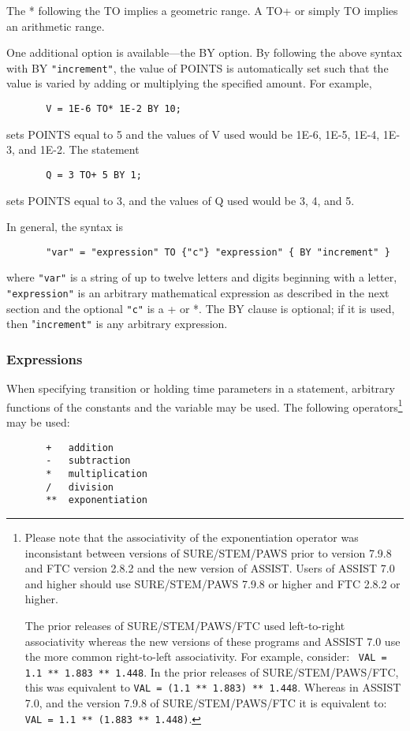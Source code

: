 The * following the {\isf TO} implies a geometric range.  A {\isf TO+} or
simply {\isf TO} implies an arithmetic range.

One additional option is available---the {\isf BY} option.  By following the
above syntax with {\isf BY} \verb|"increment"|, the value of {\isf POINTS} is
automatically set such that the value is varied by adding or multiplying the
specified amount.  For example,
\begin{verbatim}
       V = 1E-6 TO* 1E-2 BY 10;
\end{verbatim}
sets {\isf POINTS} equal to 5 and the values of {\isf V} used would be 1E-6,
1E-5, 1E-4, 1E-3, and 1E-2.  The statement
\begin{verbatim}
       Q = 3 TO+ 5 BY 1;
\end{verbatim}
sets {\isf POINTS} equal to 3, and the values of {\isf Q} used would be 3, 4,
and 5.

        In general, the syntax is
\begin{verbatim}
       "var" = "expression" TO {"c"} "expression" { BY "increment" }
\end{verbatim}
where \verb|"var"| is a string of up to twelve letters and digits beginning
with a letter, \verb|"expression"| is an arbitrary mathematical expression as
described in the next section and the optional \verb|"c"| is a + or *.  The
{\isf BY} clause is optional; if it is used, then "\verb|increment"| is any
arbitrary expression.

\subsubsection{Expressions} When specifying transition or holding 
time parameters in a statement, arbitrary functions of the constants and the
variable may be used.  The following operators\footnote{
Please note that the associativity of the exponentiation operator was
inconsistant between versions of SURE/STEM/PAWS prior to version 7.9.8 and
FTC version 2.8.2 and the new version of ASSIST.   Users of ASSIST 7.0
and higher should use SURE/STEM/PAWS 7.9.8 or higher and FTC 2.8.2 or
higher.

The prior releases of SURE/STEM/PAWS/FTC used left-to-right
associativity whereas the new versions of these programs and ASSIST 7.0 use
the more common right-to-left associativity.   For example, consider:
\verb| VAL = 1.1 ** 1.883 ** 1.448|.  In the prior releases of SURE/STEM/PAWS/FTC, 
this was equivalent to \verb|VAL = (1.1 ** 1.883) ** 1.448|. 
Whereas in ASSIST 7.0, and the version 7.9.8 of SURE/STEM/PAWS/FTC it
is equivalent to: \verb|VAL = 1.1 ** (1.883 ** 1.448)|.
}
may be used:
\begin{verbatim}
       +   addition
       -   subtraction
       *   multiplication
       /   division
       **  exponentiation
\end{verbatim}

